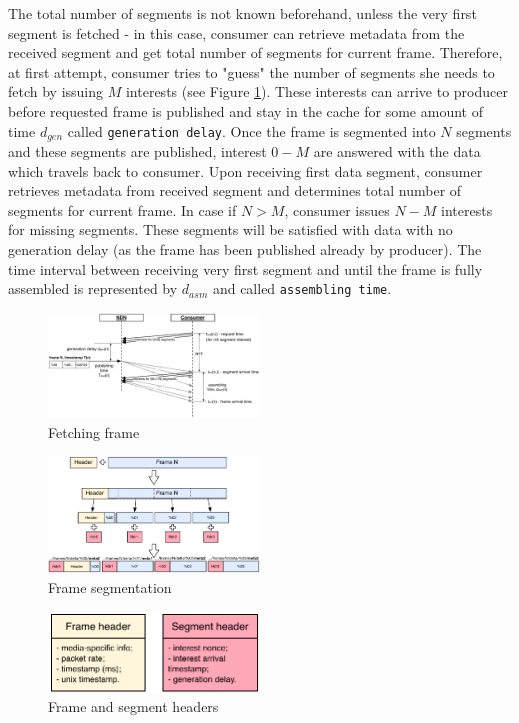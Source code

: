 \documentclass[10pt]{proc}
\begin{document}
The total number of segments is not known beforehand, unless the very first segment is fetched - in this case, consumer can retrieve metadata from the received segment and get total number of segments for current frame. 
Therefore, at first attempt, consumer tries to "guess" the number of segments she needs to fetch by issuing $M$ interests (see Figure \ref{fig:pull}). These interests can arrive to producer before requested frame is published and stay in the cache for some amount of time $d_{gen}$ called \texttt{generation delay}. Once the frame is segmented into $N$ segments and these segments are published, interest $0 - M$ are answered with the data which travels back to consumer. Upon receiving first data segment, consumer retrieves metadata from received segment and determines total number of segments for current frame. In case if $N > M$, consumer issues $N - M$ interests for missing segments. These segments will be satisfied with data with no generation delay (as the frame has been published already by producer). The time interval between receiving very first segment and until the frame is fully assembled is represented by $d_{asm}$ and called \texttt{assembling time}.

\begin{figure}[Ht!]
\centering
\includegraphics[width=0.5\textwidth]{frame-fetch}
\caption{Fetching frame}
\label{fig:pull}
\end{figure}

\begin{figure}[Ht!]
\centering
\includegraphics[width=0.5\textwidth]{segmentation}
\caption{Frame segmentation}
\label{fig:segment}
\end{figure}

\begin{figure}[Ht!]
\centering
\includegraphics[width=0.5\textwidth]{data-struct}
\caption{Frame and segment headers}
\label{fig:data-struct}
\end{figure}
\end{document}
